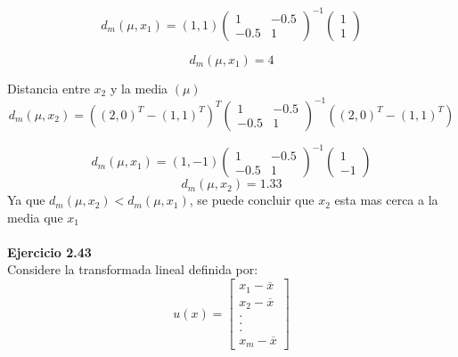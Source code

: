 \documentclass[12pt]{article}
\begin{document}
\[
	d_{m}(\mu,x_1) = (1,  1){\begin{pmatrix}
	1 & -0.5\\
	-0.5 & 1
	\end{pmatrix}}^{-1}\begin{pmatrix}
	1 \\
	1
	\end{pmatrix}
\]

\[
	d_{m}(\mu,x_1) = 4
\]

Distancia entre $x_2$ y la media $(\mu)$
\[
	d_{m}(\mu,x_2) = ((2, 0)^T-(1, 1)^T)^{T}{\begin{pmatrix}
	1 & -0.5\\
	-0.5 & 1
	\end{pmatrix}}^{-1}((2, 0)^T-(1, 1)^T)
\]

\[
	d_{m}(\mu,x_1) = (1,  -1){\begin{pmatrix}
	1 & -0.5\\
	-0.5 & 1
	\end{pmatrix}}^{-1}\begin{pmatrix}
	1 \\
	-1
	\end{pmatrix}
\]
\[
	d_{m}(\mu,x_2) = 1.33
\]
Ya que $ d_{m}(\mu,x_2) < d_{m}(\mu,x_1)$, se puede concluir que $x_2$ esta mas cerca a la media que $x_1$\\
\\
\noindent \textbf{Ejercicio 2.43}\\
Considere la transformada lineal definida por:
 \[
    u(x) = \begin{bmatrix}
    x_1 - \overline{x} \\
    x_2 - \overline{x} \\
    .\\
    .\\
    .\\
    x_m - \overline{x}
    \end{bmatrix}
    \]
\end{document}
